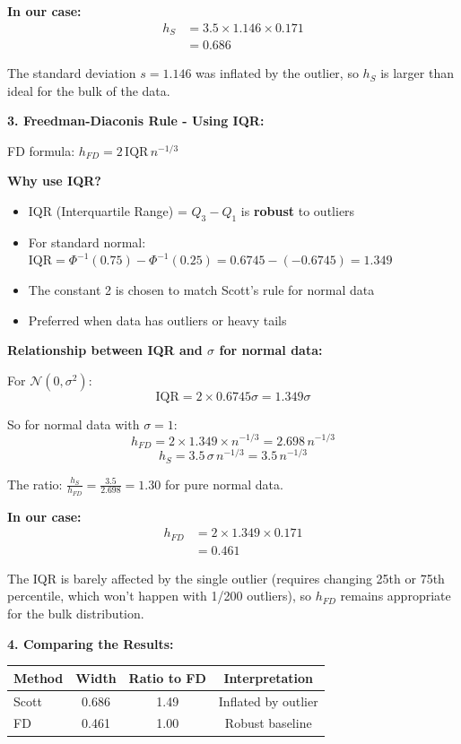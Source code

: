 \documentclass[12pt]{article}
\begin{document}
\begin{explanation}
\textbf{In our case:}
\begin{align*}
h_S &= 3.5 \times 1.146 \times 0.171 \\
&= 0.686
\end{align*}

The standard deviation \(s = 1.146\) was inflated by the outlier, so \(h_S\) is larger than ideal for the bulk of the data.

\textbf{3. Freedman-Diaconis Rule - Using IQR:}

FD formula: \(h_{FD} = 2\,\mathrm{IQR}\,n^{-1/3}\)

\textbf{Why use IQR?}
\begin{itemize}
    \item IQR (Interquartile Range) = \(Q_3 - Q_1\) is \textbf{robust} to outliers
    \item For standard normal: \(\mathrm{IQR} = \Phi^{-1}(0.75) - \Phi^{-1}(0.25) = 0.6745 - (-0.6745) = 1.349\)
    \item The constant 2 is chosen to match Scott's rule for normal data
    \item Preferred when data has outliers or heavy tails
\end{itemize}

\textbf{Relationship between IQR and \(\sigma\) for normal data:}

For \(\mathcal{N}(0, \sigma^2)\):
\[
\mathrm{IQR} = 2 \times 0.6745\sigma = 1.349\sigma
\]

So for normal data with \(\sigma = 1\):
\[
h_{FD} = 2 \times 1.349 \times n^{-1/3} = 2.698\,n^{-1/3}
\]
\[
h_S = 3.5\,\sigma\,n^{-1/3} = 3.5\,n^{-1/3}
\]

The ratio: \(\frac{h_S}{h_{FD}} = \frac{3.5}{2.698} = 1.30\) for pure normal data.

\textbf{In our case:}
\begin{align*}
h_{FD} &= 2 \times 1.349 \times 0.171 \\
&= 0.461
\end{align*}

The IQR is barely affected by the single outlier (requires changing 25th or 75th percentile, which won't happen with 1/200 outliers), so \(h_{FD}\) remains appropriate for the bulk distribution.

\textbf{4. Comparing the Results:}

\begin{center}
\begin{tabular}{|l|c|c|c|}
\hline
\textbf{Method} & \textbf{Width} & \textbf{Ratio to FD} & \textbf{Interpretation} \\
\hline
Scott & 0.686 & 1.49 & Inflated by outlier \\
FD & 0.461 & 1.00 & Robust baseline \\
\hline
\end{tabular}
\end{center}


\end{explanation}
\end{document}
